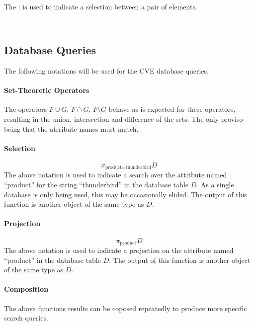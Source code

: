 \begin{bnf*}
\\
\end{bnf*}

The $|$ is used to indicate a selection between a pair of elements.
\begin{bnf*}
\\
\end{bnf*}

\subsection{Database Queries}
The following notations will be used for the CVE database queries.

\paragraph{Set-Theoretic Operators}
The operators $F\cup G$, $F \cap G$, $F\setminus G$ behave as is expected for
these operators, resulting in the union, intersection and difference of the
sets.  The only proviso being that the atrribute names must match.

\paragraph{Selection} \[\sigma_{\text{product}=\text{thunderbird}}D\]
The above notation is used to indicate a search over the attribute named
``product'' for the string ``thunderbird'' in the database table $D$.  As a
single database is only being used, this may be occasionally elided.  The output
of this function is another object of the same type as $D$.

\paragraph{Projection}
\[\pi_{\text{product}}D\]
The above notation is used to indicate a projection on the attribute named
``product'' in the database table $D$.  The output of this function is another
object of the same type as $D$.

\paragraph{Composition}
The above functions results can be coposed repeatedly to produce more specific
search queries.

